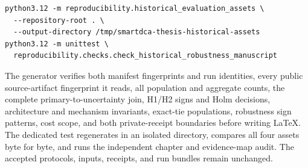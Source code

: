 \documentclass[12pt,a4paper,oneside]{report}
\begin{document}
\begin{verbatim}
python3.12 -m reproducibility.historical_evaluation_assets \
  --repository-root . \
  --output-directory /tmp/smartdca-thesis-historical-assets
python3.12 -m unittest \
  reproducibility.checks.check_historical_robustness_manuscript
\end{verbatim}

The generator verifies both manifest fingerprints and run identities, every
public source-artifact fingerprint it reads, all population and aggregate
counts, the complete primary-to-uncertainty join, H1/H2 signs and Holm
decisions, architecture and mechanism invariants, exact-tie populations,
robustness sign patterns, cost scope, and both private-receipt boundaries
before writing LaTeX. The dedicated test regenerates in an isolated directory,
compares all four assets byte for byte, and runs the independent chapter and
evidence-map audit. The accepted protocols, inputs, receipts, and run bundles
remain unchanged.

\clearpage
\renewcommand{\bibname}{Bibliography}
\begingroup
\raggedright


\endgroup
\end{document}
